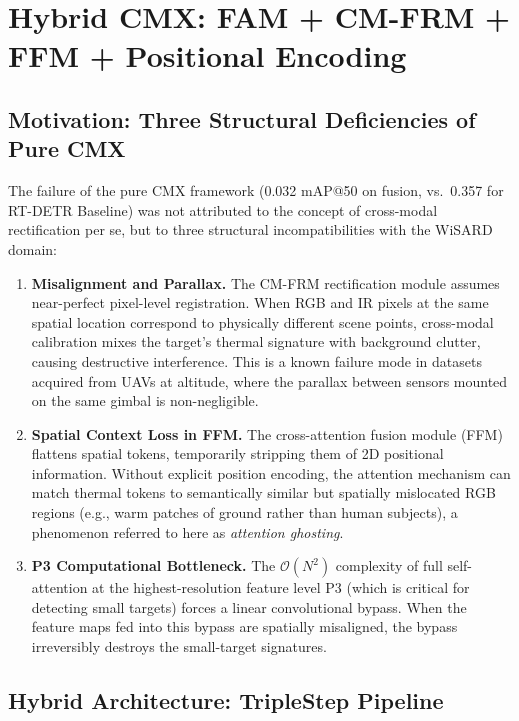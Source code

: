 \documentclass[12pt, a4paper]{article}
\begin{document}
\section{Hybrid CMX: FAM + CM-FRM + FFM + Positional Encoding}
\label{sec:hybrid_cmx}

\subsection{Motivation: Three Structural Deficiencies of Pure CMX}

The failure of the pure CMX framework (0.032 mAP@50 on fusion, vs.\ 0.357 for RT-DETR Baseline) was not attributed to the concept of cross-modal rectification per se, but to three structural incompatibilities with the WiSARD domain:

\begin{enumerate}
    \item \textbf{Misalignment and Parallax.} The CM-FRM rectification module assumes near-perfect pixel-level registration. When RGB and IR pixels at the same spatial location correspond to physically different scene points, cross-modal calibration mixes the target's thermal signature with background clutter, causing destructive interference. This is a known failure mode in datasets acquired from UAVs at altitude, where the parallax between sensors mounted on the same gimbal is non-negligible.
    \item \textbf{Spatial Context Loss in FFM.} The cross-attention fusion module (FFM) flattens spatial tokens, temporarily stripping them of 2D positional information. Without explicit position encoding, the attention mechanism can match thermal tokens to semantically similar but spatially mislocated RGB regions (e.g., warm patches of ground rather than human subjects), a phenomenon referred to here as \textit{attention ghosting}.
    \item \textbf{P3 Computational Bottleneck.} The $\mathcal{O}(N^2)$ complexity of full self-attention at the highest-resolution feature level P3 (which is critical for detecting small targets) forces a linear convolutional bypass. When the feature maps fed into this bypass are spatially misaligned, the bypass irreversibly destroys the small-target signatures.
\end{enumerate}

\newpage

\subsection{Hybrid Architecture: TripleStep Pipeline}
\end{document}
